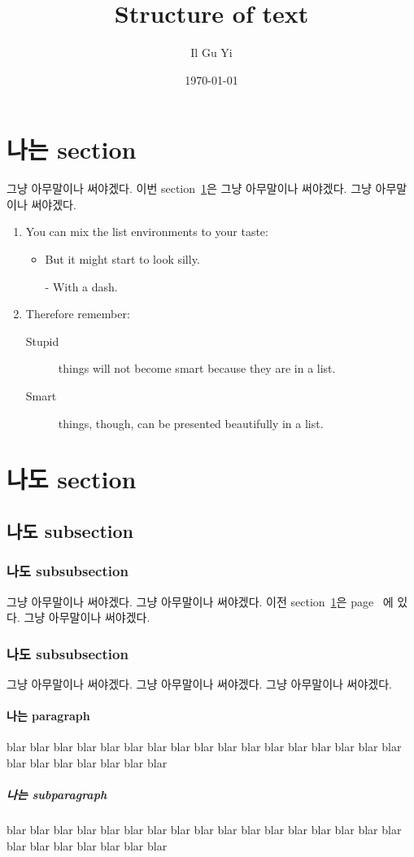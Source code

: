 \documentclass[a4paper,11pt]{article}
\author{Il Gu Yi}
\title{Structure of text}
\date{\today}
\begin{document}
\maketitle

\tableofcontents

\newpage
\section{나는 section}
\label{sec:this}
그냥 아무말이나 써야겠다.
이번 section~\ref{sec:this}은 그냥 아무말이나 써야겠다.
그냥 아무말이나 써야겠다.

\flushleft
\begin{enumerate}
  \item You can mix the list environments to your taste:
  \begin{itemize}
    \item But it might start to look silly.
    \item[-] With a dash.
  \end{itemize}
  \item Therefore remember:
  \begin{description}
    \item[Stupid] things will not
        become smart because they are in a list.
    \item[Smart] things, though, can be
        presented beautifully in a list.
  \end{description}
\end{enumerate}



\newpage
\section{나도 section}
\subsection{나도 subsection}
\subsubsection{나도 subsubsection}
그냥 아무말이나 써야겠다.
그냥 아무말이나 써야겠다.
이전 section~\ref{sec:this}은 page~\pageref{sec:this} 에 있다.
그냥 아무말이나 써야겠다.

\subsubsection*{나도 subsubsection}
그냥 아무말이나 써야겠다.
그냥 아무말이나 써야겠다.
그냥 아무말이나 써야겠다.


\paragraph{나는 paragraph}
blar blar blar blar blar blar blar blar
blar blar blar blar blar blar blar blar
blar blar blar blar blar blar blar blar

\subparagraph{나는 subparagraph}
blar blar blar blar blar blar blar blar
blar blar blar blar blar blar blar blar
blar blar blar blar blar blar blar blar
\end{document}
